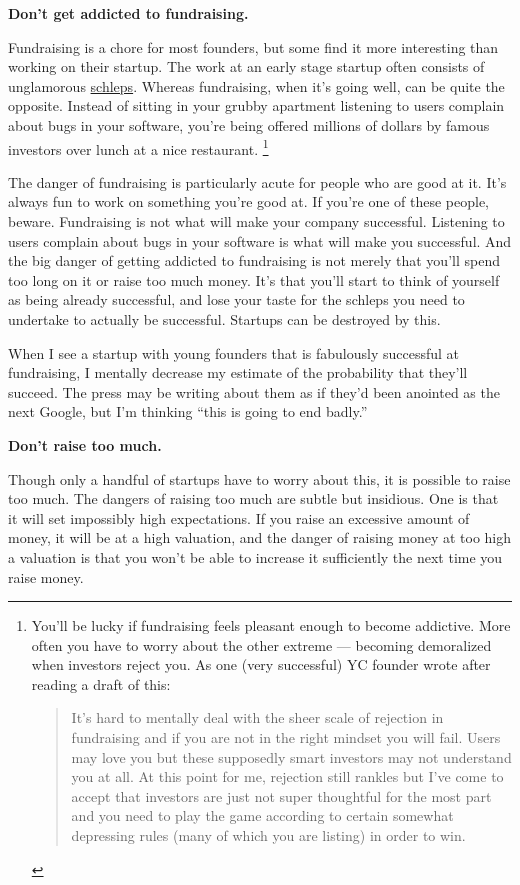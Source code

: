 \textbf{Don't get addicted to fundraising.}

Fundraising is a chore for most founders, but some find it more
interesting than working on their startup. The work at an early stage
startup often consists of unglamorous \href{schlep.html}{schleps}.
Whereas fundraising, when it's going well, can be quite the opposite.
Instead of sitting in your grubby apartment listening to users complain
about bugs in your software, you're being offered millions of dollars by
famous investors over lunch at a nice restaurant.
\footnote{You'll be lucky if fundraising feels pleasant enough to become
addictive. More often you have to worry about the other extreme ---
becoming demoralized when investors reject you. As one (very successful)
YC founder wrote after reading a draft of this:

\begin{quote}
It's hard to mentally deal with the sheer scale of rejection in
fundraising and if you are not in the right mindset you will fail. Users
may love you but these supposedly smart investors may not understand you
at all. At this point for me, rejection still rankles but I've come to
accept that investors are just not super thoughtful for the most part
and you need to play the game according to certain somewhat depressing
rules (many of which you are listing) in order to win.
\end{quote}}

The danger of fundraising is particularly acute for people who are good
at it. It's always fun to work on something you're good at. If you're
one of these people, beware. Fundraising is not what will make your
company successful. Listening to users complain about bugs in your
software is what will make you successful. And the big danger of getting
addicted to fundraising is not merely that you'll spend too long on it
or raise too much money. It's that you'll start to think of yourself as
being already successful, and lose your taste for the schleps you need
to undertake to actually be successful. Startups can be destroyed by
this.

When I see a startup with young founders that is fabulously successful
at fundraising, I mentally decrease my estimate of the probability that
they'll succeed. The press may be writing about them as if they'd been
anointed as the next Google, but I'm thinking ``this is going to end
badly.''

\textbf{Don't raise too much.}

Though only a handful of startups have to worry about this, it is
possible to raise too much. The dangers of raising too much are subtle
but insidious. One is that it will set impossibly high expectations. If
you raise an excessive amount of money, it will be at a high valuation,
and the danger of raising money at too high a valuation is that you
won't be able to increase it sufficiently the next time you raise money.

